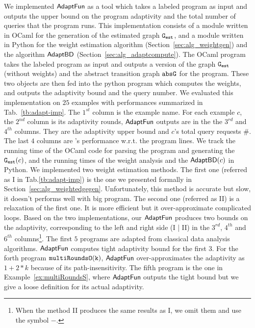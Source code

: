 
We implemented $\textsf{AdaptFun}$ as a tool which takes a labeled program as input
and outputs the upper bound on the program adaptivity and the total number of queries that the program runs.
This implementation consists of a module written in OCaml for the generation of the estimated graph $\mathtt{{G_{est}}}$, and a module written in Python for the weight estimation algorithm (Section~\ref{sec:alg_weightgen}) and the algorithm $\mathsf{AdaptBD}$ (Section~\ref{sec:alg_adaptcompute}).
The OCaml program takes the labeled program as input and outputs a version of the graph $\mathtt{{G_{est}}}$ (without weights) and the abstract transition graph $\mathtt{abs}{\mathtt{G}}$ for the program. These two objects are then
fed into the python program which computes the weights, and outputs the adaptivity bound and the query number.
%
We evaluated this implementation on $25$ examples with performances summarized in Tab.~\ref{tb:adapt-imp}.
The $1^{st}$ column is the example name.
For each example $c$, the $2^{nd}$ column is its adaptivity rounds,
$\textsf{AdaptFun}$ outputs are in the the $3^{rd}$ and $4^{th}$ columns. They are
the adaptivity upper bound and
$c$'s total query requests \#. 
The last $4$ columns are {\THESYSTEM}'s performance w.r.t. the program lines.
We track the running time of the OCaml code for parsing the program and generating the $\mathtt{{G_{est}}}(c)$,
and the running times of the weight analysis
and the $\mathsf{AdaptBD}(c)$ in Python.
We implemented two weight estimation methods. The first one (referred as I in Tab.\ref{tb:adapt-imp}) is the one we presented formally in Section~\ref{sec:alg_weightedgegen}. Unfortunately, this method is accurate but slow, it doesn't performs well with big program. The second one (referred as II) is a relaxation of the first one. It is more  efficient but it over-approximate complicated loops. Based on the two implementations, our $\textsf{AdaptFun}$ produces two bounds on the adaptivity, corresponding to the left and right side (I | II) in the $3^{rd}$, $4^{th}$ and $6^{th}$ columns\footnote{When the method II produces the same results as I, we omit them and use the symbol $-$.}.
%
The first $5$ programs are adapted from classical data analysis algorithms.
$\textsf{AdaptFun}$ computes tight adaptivity bound for the first 3.
For the forth program $\mathtt{multiRoundsO(k)}$, $\textsf{AdaptFun}$ over-approximates the adaptivity as $1 + 2*k$ because of its path-insensitivity.
The fifth program is the one in Example~\ref{ex:multiRoundsS}, where $\textsf{AdaptFun}$ outputs the tight bound but we give a loose definition for its actual adaptivity.
